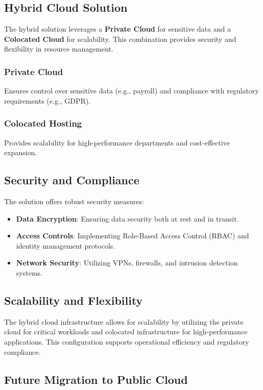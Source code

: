\subsection{Hybrid Cloud Solution}

The hybrid solution leverages a \textbf{Private Cloud} for sensitive data and a \textbf{Colocated Cloud} for scalability. This combination provides security and flexibility in resource management.

\subsubsection{Private Cloud} Ensures control over sensitive data (e.g., payroll) and compliance with regulatory requirements (e.g., GDPR).

\subsubsection{Colocated Hosting} Provides scalability for high-performance departments and cost-effective expansion.

\subsection{Security and Compliance}

The solution offers robust security measures: \begin{itemize} \item \textbf{Data Encryption}: Ensuring data security both at rest and in transit. \item \textbf{Access Controls}: Implementing Role-Based Access Control (RBAC) and identity management protocols. \item \textbf{Network Security}: Utilizing VPNs, firewalls, and intrusion detection systems. \end{itemize}

\subsection{Scalability and Flexibility}

The hybrid cloud infrastructure allows for scalability by utilizing the private cloud for critical workloads and colocated infrastructure for high-performance applications. This configuration supports operational efficiency and regulatory compliance.

\subsection{Future Migration to Public Cloud}

